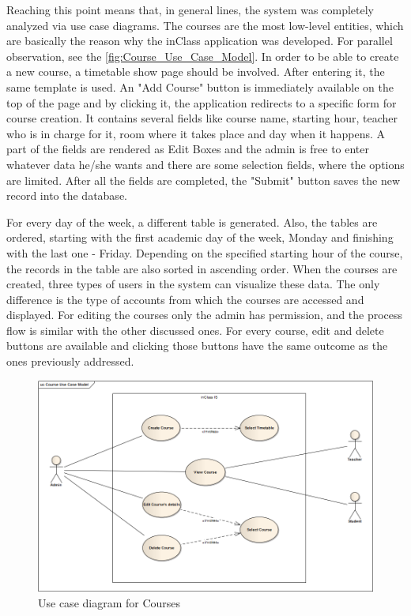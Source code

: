 Reaching this point means that, in general lines, the system was completely analyzed via use case diagrams. The courses are the most low-level entities, which are basically the reason why the inClass application was developed. For parallel observation, see the \autoref{fig:Course_Use_Case_Model}. In order to be able to create a new course, a timetable show page should be involved. After entering it, the same template is used. An "Add Course" button is immediately available on the top of the page and by clicking it, the application redirects to a specific form for course creation. It contains several fields like course name, starting hour, teacher who is in charge for it, room where it takes place and day when it happens. A part of the fields are rendered as Edit Boxes and the admin is free to enter whatever data he/she wants and there are some selection fields, where the options are limited. After all the fields are completed, the "Submit" button saves the new record into the database. 

For every day of the week, a different table is generated. Also, the tables are ordered, starting with the first academic day of the week, Monday and finishing with the last one - Friday. Depending on the specified starting hour of the course, the records in the table are also sorted in ascending order. When the courses are created, three types of users in the system can visualize these data. The only difference is the type of accounts from which the courses are accessed and displayed. For editing the courses only the admin has permission, and the process flow is similar with the other discussed ones. For every course, edit and delete buttons are available and clicking those buttons have the same outcome as the ones previously addressed. 

\begin{figure}[H]
\centering
\includegraphics[width=14cm]{Chapter2/Course_Use_Case_Model.png}
\caption{Use case diagram for Courses}
\label{fig:Course_Use_Case_Model}
\end{figure}

